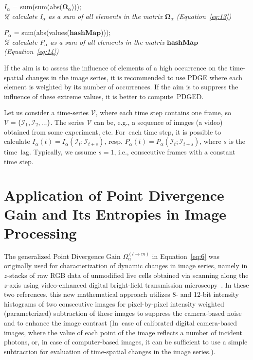 \documentclass[entropy,article,accept,moreauthors,pdftex,10pt,a4paper]{mdpi}
\begin{document}
\begin{algorithm}[H]
$I_\alpha$ = sum(sum(abs($\mathbf{\Omega}_\alpha$)));\\
\qquad \emph{\% calculate I$_\alpha$ as a sum of all elements in the matrix $\mathbf{\Omega}_\alpha$ (Equation~\eqref{eq:13})}

$P_\alpha$ = sum(abs(values($\mathbf{hashMap}$)));\\
\qquad \emph{\% calculate P$_\alpha$ as a sum of all elements in the matrix $\mathbf{hashMap}$ (Equation~\eqref{eq:14})}

\BlankLine
\BlankLine
\end{algorithm}
\newpage
If the aim is to assess the influence of elements of a high occurrence on the time-spatial changes in the image series, it is recommended to use PDGE where each element is weighted by its number of occurrences. If the aim is to suppress the influence of these extreme values, it is better to compute~PDGED.

Let us consider a time-series $\mathcal{V}$, where each time step contains one frame, so $\mathcal{V} = \{\mathcal{I}_1,\mathcal{I}_2,\dots\}$. The series $\mathcal{V}$ can be, e.g., a sequence of images (a video) obtained from some experiment, etc. For~each time step, it is possible to calculate
$I_\alpha(t) = I_\alpha(\mathcal{I}_t;\mathcal{I}_{t+s})$, resp. $P_\alpha(t) = P_\alpha(\mathcal{I}_t;\mathcal{I}_{t+s})$, where $s$ is the time~lag. Typically, we assume $s=1$, i.e., consecutive frames with a constant time step.

\section{Application of Point Divergence Gain and Its Entropies in Image Processing}\label{sec.3}

The generalized Point Divergence Gain $\Omega_{\alpha}^{(l \rightarrow m)}$ in Equation~\eqref{eq:6} was originally used for characterization of dynamic changes in image series, namely in $z$-stacks of raw RGB data of unmodified live cells obtained via scanning along the $z$-axis using video-enhanced digital bright-field transmission microscopy~\cite{Ryc15,Ryc16c}. In these two references, this new mathematical approach utilizes 8- and 12-bit intensity histograms of two consecutive images for pixel-by-pixel intensity weighted (parameterized) subtraction of these images to suppress the camera-based noise and to enhance the image contrast ({{In~case of calibrated digital} camera-based images, where the value of each point of the image reflects a number of incident photons, or, in case of computer-based images, it can be sufficient to use a simple subtraction for evaluation of time-spatial changes in the image series.}).
\end{document}
